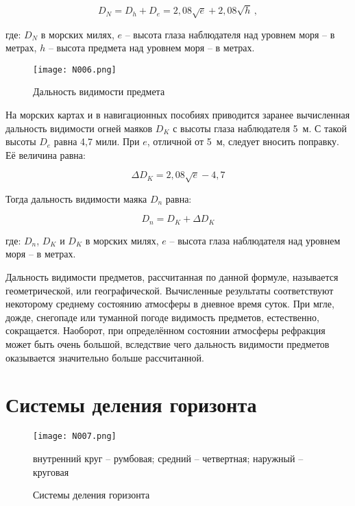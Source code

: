 \begin{equation}
  D_N = D_h + D_e = 2,08 \sqrt{e} + 2,08 \sqrt{h} \, , 
\end{equation}

где: $D_N$ в морских милях, $e$ \--- высота глаза наблюдателя над
уровнем моря \--- в метрах, $h$ \--- высота предмета над уровнем моря
\--- в метрах.

\begin{figure*}[htb]
  \centering{}
  \texttt{[image: N006.png]}
  \caption{Дальность видимости предмета}
  \label{fig:N6}
\end{figure*}

На морских картах и в навигационных пособиях приводится заранее
вычисленная дальность видимости огней маяков $D_K$ с высоты глаза
наблюдателя 5~м. С такой высоты $D_e$ равна 4,7 мили. При $e$,
отличной от 5~м, следует вносить поправку. Её величина равна:

\begin{equation}
  \Delta D_K = 2,08 \sqrt{e} - 4,7 
\end{equation}

Тогда дальность видимости маяка $D_n$ равна: 

\begin{equation}
  D_n = D_K +  \Delta D_K 
\end{equation}

где: $D_n$, $D_K$ и $D_K$ в морских милях, $e$ \--- высота глаза
наблюдателя над уровнем моря \--- в метрах.
 
Дальность видимости предметов, рассчитанная по данной формуле,
называется геометрической, или географической. Вычисленные результаты
соответствуют некоторому среднему состоянию атмосферы в дневное время
суток. При мгле, дожде, снегопаде или туманной погоде видимость
предметов, естественно, сокращается. Наоборот, при определённом
состоянии атмосферы рефракция может быть очень большой, вследствие
чего дальность видимости предметов оказывается значительно больше
рассчитанной.

\section{Системы деления горизонта}

\begin{figure}[htb]
  \centering{}
  \texttt{[image: N007.png]}
  \caption{Системы деления горизонта}
  \label{fig:N7}
  \small
  \centering{}
  внутренний круг \--- румбовая; средний \--- четвертная; наружный \--- круговая
\end{figure}


